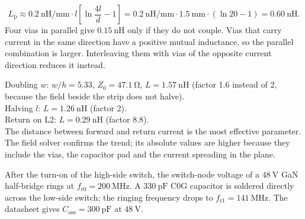 
\begin{solutionblock}
	\begin{equation}
		L_\mathrm{p}\approx\SI{0.2}{\nano\henry\per\milli\metre}\cdot l\left[\ln\frac{4l}{d}-1\right] = \SI{0.2}{\nano\henry\per\milli\metre}\cdot\SI{1.5}{\milli\metre}\cdot(\ln 20-1) = \SI{0.60}{\nano\henry}.
	\end{equation}
	Four vias in parallel give $\SI{0.15}{\nano\henry}$ only if they do not couple. Vias that carry current in the same direction have a positive mutual inductance, so the parallel combination is larger. Interleaving them with vias of the opposite current direction reduces it instead.
\end{solutionblock}


\begin{solutionblock}
	Doubling $w$: $w/h=5.33$, $Z_0=\SI{47.1}{\ohm}$, $L=\SI{1.57}{\nano\henry}$ (factor 1.6 instead of 2, because the field beside the strip does not halve).\\
	Halving $l$: $L=\SI{1.26}{\nano\henry}$ (factor 2).\\
	Return on L2: $L=\SI{0.29}{\nano\henry}$ (factor 8.8).\\
	The distance between forward and return current is the most effective parameter. The field solver confirms the trend; its absolute values are higher because they include the vias, the capacitor pad and the current spreading in the plane.
\end{solutionblock}



After the turn-on of the high-side switch, the switch-node voltage of a $\SI{48}{\volt}$ GaN half-bridge rings at $f_\mathrm{r0}=\SI{200}{\mega\hertz}$. A $\SI{330}{\pico\farad}$ C0G capacitor is soldered directly across the low-side switch; the ringing frequency drops to $f_\mathrm{r1}=\SI{141}{\mega\hertz}$. The datasheet gives $C_\mathrm{oss}=\SI{300}{\pico\farad}$ at $\SI{48}{\volt}$.

